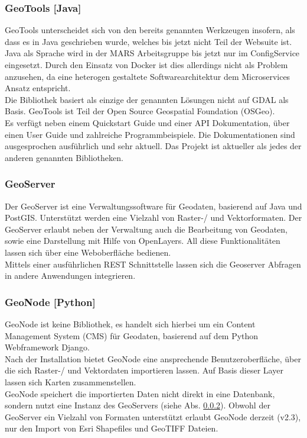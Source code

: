 \documentclass[10pt,conference,compsocconf]{IEEEtran}
\begin{document}
\subsubsection{GeoTools [Java]}
\label{GeoTools}
GeoTools unterscheidet sich von den bereits genannten Werkzeugen insofern, als dass es in Java geschrieben wurde, welches bis jetzt nicht Teil der Websuite ist. Java als Sprache wird in der MARS Arbeitsgruppe bis jetzt nur im ConfigService eingesetzt. Durch den Einsatz von Docker ist dies allerdings nicht als Problem anzusehen, da eine heterogen gestaltete Softwarearchitektur dem Microservices Ansatz entspricht.\\
Die Bibliothek basiert als einzige der genannten Lösungen nicht auf GDAL als Basis. GeoTools ist Teil der Open Source Geospatial Foundation (OSGeo).\\
Es verfügt neben einem Quickstart Guide und einer API Dokumentation, über einen User Guide und zahlreiche Programmbeispiele. Die Dokumentationen sind ausgesprochen ausführlich und sehr aktuell. Das Projekt ist aktueller als jedes der anderen genannten Bibliotheken.

\subsubsection{GeoServer}
\label{subsubsubsec:GeoServer}
Der GeoServer ist eine Verwaltungssoftware für Geodaten, basierend auf Java und PostGIS. Unterstützt werden eine Vielzahl von Raster-/ und Vektorformaten. Der GeoServer erlaubt neben der Verwaltung auch die Bearbeitung von Geodaten, sowie eine Darstellung mit Hilfe von OpenLayers. All diese Funktionalitäten lassen sich über eine Weboberfläche bedienen.\\
Mittels einer ausführlichen REST Schnittstelle lassen sich die Geoserver Abfragen in andere Anwendungen integrieren.

\subsubsection{GeoNode [Python]}
GeoNode ist keine Bibliothek, es handelt sich hierbei um ein Content Management System (CMS) für Geodaten, basierend auf dem Python Webframework Django.\\
Nach der Installation bietet GeoNode eine ansprechende Benutzeroberfläche, über die sich Raster-/ und Vektordaten importieren lassen. Auf Basis dieser Layer lassen sich Karten zusammenstellen.\\
GeoNode speichert die importierten Daten nicht direkt in eine Datenbank, sondern nutzt eine Instanz des GeoServers (siehe Abs. \ref{subsubsubsec:GeoServer}). Obwohl der GeoServer ein Vielzahl von Formaten unterstützt erlaubt GeoNode derzeit (v2.3), nur den Import von Esri Shapefiles und GeoTIFF Dateien.
\end{document}
